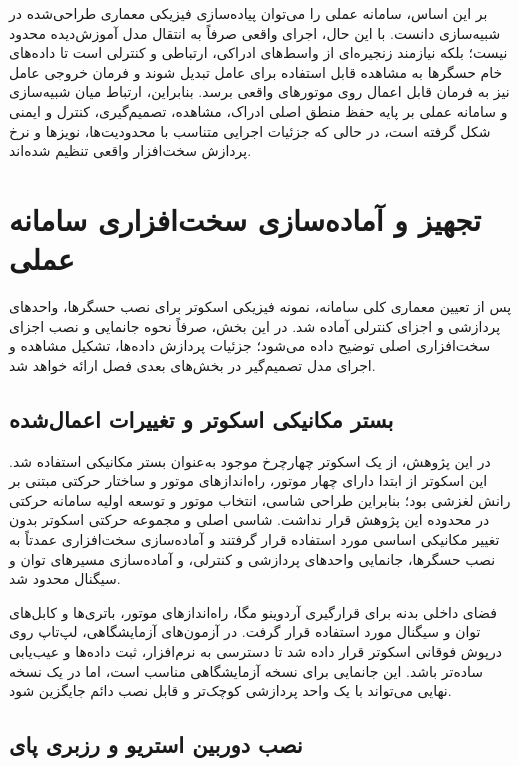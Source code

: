 بر این اساس، سامانه عملی را می‌توان پیاده‌سازی فیزیکی معماری طراحی‌شده در شبیه‌سازی دانست. با این حال، اجرای واقعی صرفاً به انتقال مدل آموزش‌دیده محدود نیست؛ بلکه نیازمند زنجیره‌ای از واسط‌های ادراکی، ارتباطی و کنترلی است تا داده‌های خام حسگرها به مشاهده قابل استفاده برای عامل تبدیل شوند و فرمان خروجی عامل نیز به فرمان قابل اعمال روی موتورهای واقعی برسد. بنابراین، ارتباط میان شبیه‌سازی و سامانه عملی بر پایه حفظ منطق اصلی ادراک، مشاهده، تصمیم‌گیری، کنترل و ایمنی شکل گرفته است، در حالی که جزئیات اجرایی متناسب با محدودیت‌ها، نویزها و نرخ پردازش سخت‌افزار واقعی تنظیم شده‌اند.


\section{تجهیز و آماده‌سازی سخت‌افزاری سامانه عملی}
\label{sec:real_hardware_preparation}

پس از تعیین معماری کلی سامانه، نمونه فیزیکی اسکوتر برای نصب حسگرها، واحدهای پردازشی و اجزای کنترلی آماده شد. در این بخش، صرفاً نحوه جانمایی و نصب اجزای سخت‌افزاری اصلی توضیح داده می‌شود؛ جزئیات پردازش داده‌ها، تشکیل مشاهده و اجرای مدل تصمیم‌گیر در بخش‌های بعدی فصل ارائه خواهد شد.

\subsection{بستر مکانیکی اسکوتر و تغییرات اعمال‌شده}
\label{subsec:real_scooter_platform}

در این پژوهش، از یک اسکوتر چهارچرخ موجود به‌عنوان بستر مکانیکی استفاده شد. این اسکوتر از ابتدا دارای چهار موتور، راه‌اندازهای موتور و ساختار حرکتی مبتنی بر رانش لغزشی بود؛ بنابراین طراحی شاسی، انتخاب موتور و توسعه اولیه سامانه حرکتی در محدوده این پژوهش قرار نداشت. شاسی اصلی و مجموعه حرکتی اسکوتر بدون تغییر مکانیکی اساسی مورد استفاده قرار گرفتند و آماده‌سازی سخت‌افزاری عمدتاً به نصب حسگرها، جانمایی واحدهای پردازشی و کنترلی، و آماده‌سازی مسیرهای توان و سیگنال محدود شد.

فضای داخلی بدنه برای قرارگیری آردوینو مگا، راه‌اندازهای موتور، باتری‌ها و کابل‌های توان و سیگنال مورد استفاده قرار گرفت. در آزمون‌های آزمایشگاهی، لپ‌تاپ روی درپوش فوقانی اسکوتر قرار داده شد تا دسترسی به نرم‌افزار، ثبت داده‌ها و عیب‌یابی ساده‌تر باشد. این جانمایی برای نسخه آزمایشگاهی مناسب است، اما در یک نسخه نهایی می‌تواند با یک واحد پردازشی کوچک‌تر و قابل نصب دائم جایگزین شود.

\subsection{نصب دوربین استریو و رزبری پای}
\label{subsec:stereo_camera_raspberry_installation}

